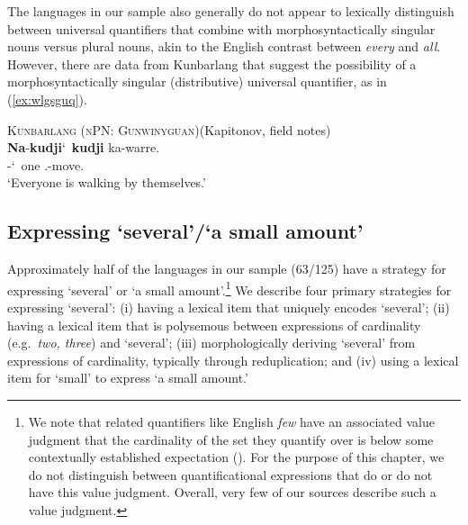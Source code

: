 \documentclass[12pt,egregdoesnotlikesansseriftitles]{scrartcl}
\newcommand{\ofy}{/125} %
\begin{document}
The languages in our sample also generally do not appear to lexically distinguish between universal quantifiers that  combine with morphosyntactically singular nouns versus plural nouns, akin to the 
English contrast between \textit{every} and \textit{all}. However, there are data from Kunbarlang that suggest the possibility of a morphosyntactically singular (distributive) universal quantifier, as in (\ref{ex:wlgsguq}).
\begin{exe}
  \ex\textsc{Kunbarlang (nPN: Gunwinyguan)}\hfill (Kapitonov, field notes)\\
  \gll \textbf{Na}-\textbf{kudji}\char`~\textbf{kudji} ka-warre.\\
  \Cli-\Rdp\char`~one \Tsg.\Nfut-move.\Np\\
  \glt `Everyone is walking by themselves.' \label{ex:wlgsguq} %
\end{exe}



\subsection{Expressing `several'/`a small amount'}

Approximately half of the languages in our sample (63\ofy) have a strategy for expressing `several' or `a small amount'.\footnote{We note that related quantifiers like English \textit{few} have an associated value judgment that the cardinality of the set they quantify over is below some contextually established expectation (\citealt{keenan17qu}). For the purpose of this chapter, we do not distinguish between quantificational expressions that do or do not have this value judgment. Overall, very few of our sources describe such a value judgment.} We describe four primary strategies for expressing `several': (i) having a lexical item that uniquely encodes `several'; (ii) having a lexical item that is polysemous between expressions of cardinality (e.g.\ \textit{two, three}) and `several'; (iii) morphologically deriving `several' from expressions of cardinality, typically through reduplication; and (iv) using a lexical item for `small' to express `a small amount.'
\end{document}
